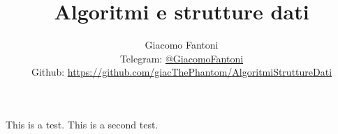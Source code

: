 
\title{\Huge \textbf{Algoritmi e strutture dati}}
\author{
  Giacomo Fantoni \\
  \small Telegram: \href{https://t.me/GiacomoFantoni}{@GiacomoFantoni} \\[3pt]
  \small Github: \href{https://github.com/giacThePhantom/AlgoritmiStruttureDati}{https://github.com/giacThePhantom/AlgoritmiStruttureDati}}

\maketitle
\tableofcontents









This is a test.
This is a second test.


